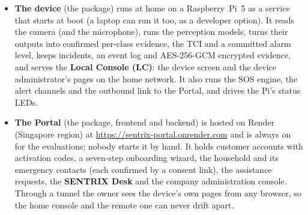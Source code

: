 \begin{itemize}
\item \textbf{The device} (the  package) runs at home on a Raspberry~Pi~5 as a service that starts at boot (a laptop can run it too, as a developer option). It reads the camera (and the microphone), runs the perception models, turns their outputs into confirmed per-class evidence, the TCI and a committed alarm level, keeps incidents, an event log and AES-256-GCM encrypted evidence, and serves the \textbf{Local Console (LC)}: the device screen and the device administrator's pages on the home network. It also runs the SOS engine, the alert channels and the outbound link to the Portal, and drives the Pi's status LEDs.
\item \textbf{The Portal} (the  package, frontend and backend) is hosted on Render (Singapore region) at \url{https://sentrix-portal.onrender.com} and is always on for the evaluations; nobody starts it by hand. It holds customer accounts with activation codes, a seven-step onboarding wizard, the household and its emergency contacts (each confirmed by a consent link), the assistance requests, the \textbf{SENTRIX Desk} and the company administration console. Through a tunnel the owner sees the device's own pages from any browser, so the home console and the remote one can never drift apart.
\end{itemize}

